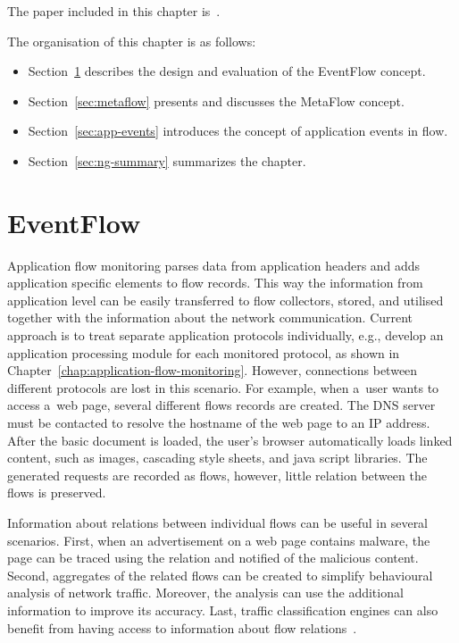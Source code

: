 \begin{chapintro}
The paper included in this chapter is~\cite{Velan-2016-EventFlow}.

The organisation of this chapter is as follows:
\begin{itemize}
  \item Section~\ref{sec:eventflow} describes the design and evaluation of the EventFlow concept.
  \item Section~\ref{sec:metaflow} presents and discusses the MetaFlow concept.
  \item Section~\ref{sec:app-events} introduces the concept of application events in flow.
  \item Section~\ref{sec:ng-summary} summarizes the chapter.
\end{itemize}

\end{chapintro}

\newpage

\section{EventFlow}\label{sec:eventflow}

Application flow monitoring parses data from application headers and adds application specific elements to flow records. This way the information from application level can be easily transferred to flow collectors, stored, and utilised together with the information about the network communication. Current approach is to treat separate application protocols individually, e.g., develop an application processing module for each monitored protocol, as shown in Chapter~\ref{chap:application-flow-monitoring}. However, connections between different protocols are lost in this scenario. For example, when a~user wants to access a~web page, several different flows records are created. The DNS server must be contacted to resolve the hostname of the web page to an IP address. After the basic document is loaded, the user's browser automatically loads linked content, such as images, cascading style sheets, and java script libraries. The generated requests are recorded as flows, however, little relation between the flows is preserved.

Information about relations between individual flows can be useful in several scenarios. First, when an advertisement on a web page contains malware, the page can be traced using the relation and notified of the malicious content. Second, aggregates of the related flows can be created to simplify behavioural analysis of network traffic. Moreover, the analysis can use the additional information to improve its accuracy. Last, traffic classification engines can also benefit from having access to information about flow relations~\cite{Wang-2014-Internet}.

